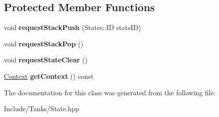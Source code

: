 \subsection*{Protected Member Functions}
\begin{DoxyCompactItemize}
\item 
\hypertarget{class_state_a6763de833ceb9c23df45aff163a4a1cd}{}void {\bfseries request\+Stack\+Push} (States\+::\+I\+D state\+I\+D)\label{class_state_a6763de833ceb9c23df45aff163a4a1cd}

\item 
\hypertarget{class_state_aa418660892d6161772c907bd8d70f910}{}void {\bfseries request\+Stack\+Pop} ()\label{class_state_aa418660892d6161772c907bd8d70f910}

\item 
\hypertarget{class_state_a4b602bed9bf0179ee5f6748fce340ae6}{}void {\bfseries request\+State\+Clear} ()\label{class_state_a4b602bed9bf0179ee5f6748fce340ae6}

\item 
\hypertarget{class_state_aec041e226f59f134902ca8671c02788c}{}\hyperlink{struct_state_1_1_context}{Context} {\bfseries get\+Context} () const \label{class_state_aec041e226f59f134902ca8671c02788c}

\end{DoxyCompactItemize}


The documentation for this class was generated from the following file\+:\begin{DoxyCompactItemize}
\item 
Include/\+Tanks/State.\+hpp\end{DoxyCompactItemize}
